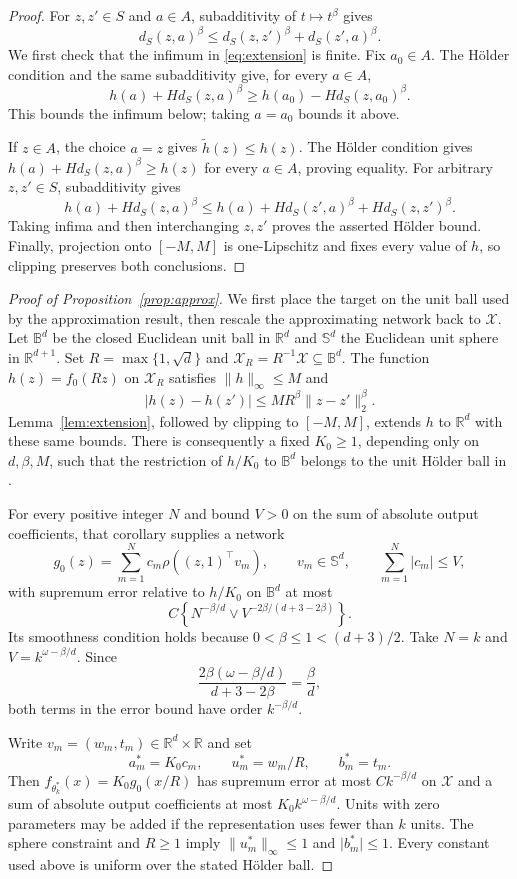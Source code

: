 \documentclass[11pt,a4paper]{article}
\theoremstyle{remark}
\newcommand{\Xcal}{\mathcal X}
\newcommand{\norm}[1]{\lVert#1\rVert}
\newcommand{\abs}[1]{\lvert#1\rvert}
\begin{document}
\begingroup
\begin{proof}
For $z,z'\in S$ and $a\in A$, subadditivity of
$t\mapsto t^\beta$ gives
\[
d_S(z,a)^\beta\leq d_S(z,z')^\beta+d_S(z',a)^\beta.
\]
We first check that the infimum in \eqref{eq:extension} is finite.
Fix $a_0\in A$. The H\"older condition and the same subadditivity give,
for every $a\in A$,
\[
h(a)+H d_S(z,a)^\beta
\geq h(a_0)-H d_S(z,a_0)^\beta.
\]
This bounds the infimum below; taking $a=a_0$ bounds it above.

If $z\in A$, the choice $a=z$ gives $\widetilde h(z)\leq h(z)$.
The H\"older condition gives $h(a)+H d_S(z,a)^\beta\geq h(z)$
for every $a\in A$, proving equality. For arbitrary $z,z'\in S$,
subadditivity gives
\[
h(a)+H d_S(z,a)^\beta
\leq h(a)+H d_S(z',a)^\beta+H d_S(z,z')^\beta.
\]
Taking infima and then interchanging $z,z'$ proves the asserted
H\"older bound. Finally, projection onto $[-M,M]$ is one-Lipschitz
and fixes every value of $h$, so clipping preserves both conclusions.
\end{proof}
\endgroup

\begingroup
\begin{proof}[Proof of Proposition~\ref{prop:approx}]
We first place the target on the unit ball used by the approximation
result, then rescale the approximating network back to $\Xcal$.
Let $\mathbb B^d$ be the closed Euclidean unit ball in $\mathbb R^d$
and $\mathbb S^d$ the Euclidean unit sphere in $\mathbb R^{d+1}$.
Set $R=\max\{1,\sqrt d\}$ and
$\Xcal_R=R^{-1}\Xcal\subseteq\mathbb B^d$.
The function $h(z)=f_0(Rz)$ on $\Xcal_R$ satisfies
$\norm h_\infty\leq M$ and
\[
\abs{h(z)-h(z')}\leq MR^\beta\norm{z-z'}_2^\beta.
\]
Lemma~\ref{lem:extension}, followed by clipping to $[-M,M]$,
extends $h$ to $\mathbb R^d$ with these same bounds.
There is consequently a fixed $K_0\geq1$, depending only on
$d,\beta,M$, such that the restriction of $h/K_0$ to $\mathbb B^d$
belongs to the unit H\"older ball in
\citet[Cor.~2.4(3)]{yangzhou2025}.

For every positive integer $N$ and bound $V>0$ on the sum of absolute output coefficients, that
corollary supplies a network
\[
g_0(z)=\sum_{m=1}^N c_m\rho((z,1)^\top v_m),
\qquad v_m\in\mathbb S^d,\qquad \sum_{m=1}^N\abs{c_m}\leq V,
\]
with supremum error relative to $h/K_0$ on $\mathbb B^d$ at most
\[
C\left\{N^{-\beta/d}\vee
V^{-2\beta/(d+3-2\beta)}\right\}.
\]
Its smoothness condition holds because
$0<\beta\leq1<(d+3)/2$. Take $N=k$ and
$V=k^{\omega-\beta/d}$. Since
\[
\frac{2\beta(\omega-\beta/d)}{d+3-2\beta}=\frac\beta d,
\]
both terms in the error bound have order $k^{-\beta/d}$.

Write $v_m=(w_m,t_m)\in\mathbb R^d\times\mathbb R$ and set
\[
a_m^*=K_0c_m,\qquad u_m^*=w_m/R,\qquad b_m^*=t_m.
\]
Then $f_{\theta_k^*}(x)=K_0g_0(x/R)$ has supremum error at most
$Ck^{-\beta/d}$ on $\Xcal$ and a sum of absolute output coefficients at
most $K_0k^{\omega-\beta/d}$. Units with zero parameters may be
added if the representation uses fewer than $k$ units.
The sphere constraint and $R\geq1$ imply
$\norm{u_m^*}_\infty\leq1$ and $\abs{b_m^*}\leq1$.
Every constant used above is uniform over the stated H\"older ball.
\end{proof}
\endgroup
\end{document}
